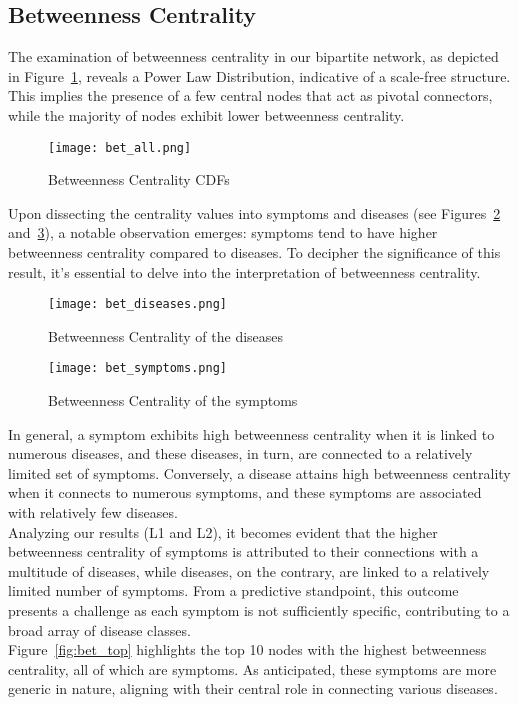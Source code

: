 \subsection{Betweenness Centrality}
The examination of betweenness centrality in our bipartite network, as depicted in Figure~\ref{fig:bet_all},
reveals a Power Law Distribution, indicative of a scale-free structure. This implies the presence of a few central
nodes that act as pivotal connectors, while the majority of nodes exhibit lower betweenness centrality.

\begin{figure}[H]
    \centering
    \texttt{[image: bet\_all.png]}
    \caption{Betweenness Centrality CDFs}
    \label{fig:bet_all}
\end{figure}
\noindent
Upon dissecting the centrality values into symptoms and diseases (see Figures~\ref{fig:bet_diseases} and~\ref{fig:bet_symptoms}),
a notable observation emerges: symptoms tend to have higher betweenness centrality compared to diseases. To decipher the
significance of this result, it's essential to delve into the interpretation of betweenness centrality.

\begin{figure}[H]
    \centering
    \texttt{[image: bet\_diseases.png]}
    \caption{Betweenness Centrality of the diseases}
    \label{fig:bet_diseases}
\end{figure}
\noindent
\begin{figure}[H]
    \centering
    \texttt{[image: bet\_symptoms.png]}
    \caption{Betweenness Centrality of the symptoms}
    \label{fig:bet_symptoms}
\end{figure}
\noindent
In general, a symptom exhibits high betweenness centrality when it is linked to numerous diseases, and these diseases,
in turn, are connected to a relatively limited set of symptoms. Conversely, a disease attains high betweenness centrality
when it connects to numerous symptoms, and these symptoms are associated with relatively few diseases.\\
Analyzing our results (L1 and L2), it becomes evident that the higher betweenness centrality of symptoms is attributed
to their connections with a multitude of diseases, while diseases, on the contrary, are linked to a relatively limited
number of symptoms. From a predictive standpoint, this outcome presents a challenge as each symptom is not sufficiently
specific, contributing to a broad array of disease classes.\\
Figure~\ref{fig:bet_top} highlights the top 10 nodes with the highest betweenness centrality, all of which are symptoms.
As anticipated, these symptoms are more generic in nature, aligning with their central role in connecting various diseases.

